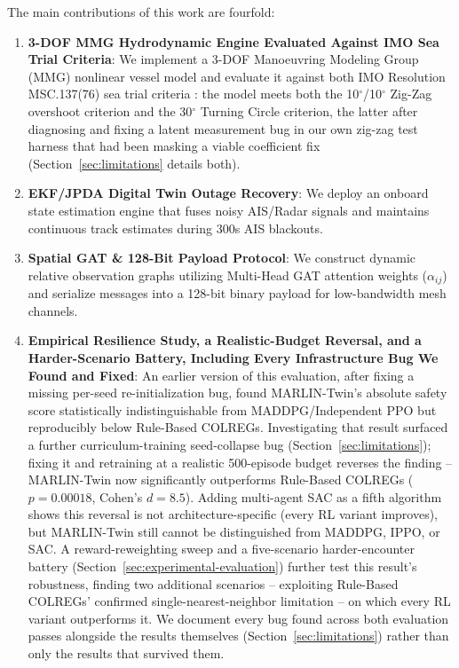 \documentclass[journal,twocolumn,10pt]{IEEEtran}
\begin{document}
The main contributions of this work are fourfold:
\begin{enumerate}
    \item \textbf{3-DOF MMG Hydrodynamic Engine Evaluated Against IMO Sea Trial Criteria}: We implement a 3-DOF Manoeuvring Modeling Group (MMG) nonlinear vessel model and evaluate it against both IMO Resolution MSC.137(76) sea trial criteria \cite{imo2002standards}: the model meets both the 10$^\circ$/10$^\circ$ Zig-Zag overshoot criterion and the 30$^\circ$ Turning Circle criterion, the latter after diagnosing and fixing a latent measurement bug in our own zig-zag test harness that had been masking a viable coefficient fix (Section~\ref{sec:limitations} details both).
    \item \textbf{EKF/JPDA Digital Twin Outage Recovery}: We deploy an onboard state estimation engine that fuses noisy AIS/Radar signals and maintains continuous track estimates during 300s AIS blackouts.
    \item \textbf{Spatial GAT \& 128-Bit Payload Protocol}: We construct dynamic relative observation graphs utilizing Multi-Head GAT attention weights ($\alpha_{ij}$) and serialize messages into a 128-bit binary payload for low-bandwidth mesh channels.
    \item \textbf{Empirical Resilience Study, a Realistic-Budget Reversal, and a Harder-Scenario Battery, Including Every Infrastructure Bug We Found and Fixed}: An earlier version of this evaluation, after fixing a missing per-seed re-initialization bug, found MARLIN-Twin's absolute safety score statistically indistinguishable from MADDPG/Independent PPO but reproducibly below Rule-Based COLREGs. Investigating that result surfaced a further curriculum-training seed-collapse bug (Section~\ref{sec:limitations}); fixing it and retraining at a realistic 500-episode budget reverses the finding -- MARLIN-Twin now significantly outperforms Rule-Based COLREGs ($p=0.00018$, Cohen's $d=8.5$). Adding multi-agent SAC as a fifth algorithm shows this reversal is not architecture-specific (every RL variant improves), but MARLIN-Twin still cannot be distinguished from MADDPG, IPPO, or SAC. A reward-reweighting sweep and a five-scenario harder-encounter battery (Section~\ref{sec:experimental-evaluation}) further test this result's robustness, finding two additional scenarios -- exploiting Rule-Based COLREGs' confirmed single-nearest-neighbor limitation -- on which every RL variant outperforms it. We document every bug found across both evaluation passes alongside the results themselves (Section~\ref{sec:limitations}) rather than only the results that survived them.
\end{enumerate}
\end{document}
